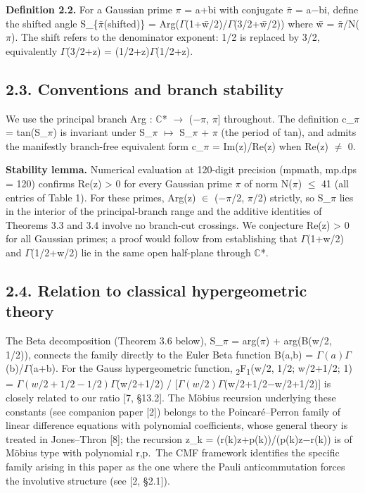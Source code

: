 \documentclass[11pt]{article}
\begin{document}
\textbf{Definition 2.2.} For a Gaussian prime \(\pi\) = a+bi with
conjugate \(\bar{\pi}\) = a−bi, define the shifted angle
S\_\{\(\bar{\pi}\)(shifted)\} =
Arg(\(\Gamma\)(1+w̄/2)/\(\Gamma\)(3/2+w̄/2)) where w̄ =
\(\bar{\pi}\)/N(\(\pi\)). The shift refers to the denominator exponent:
1/2 is replaced by 3/2, equivalently \(\Gamma\)(3/2+z) =
(1/2+z)\(\Gamma\)(1/2+z).

\hypertarget{conventions-and-branch-stability}{%
\subsection{2.3. Conventions and branch
stability}\label{conventions-and-branch-stability}}

We use the principal branch Arg : \(\mathbb{C}\)* \(\to\) (−\(\pi\),
\(\pi\){]} throughout. The definition c\_\(\pi\) =
\textbar tan(S\_\(\pi\))\textbar{} is invariant under S\_\(\pi\)
\(\mapsto\) S\_\(\pi\) + \(\pi\) (the period of tan), and admits the
manifestly branch-free equivalent form c\_\(\pi\) =
\textbar Im(z)/Re(z)\textbar{} when Re(z) \(\neq\) 0.

\textbf{Stability lemma.} Numerical evaluation at 120-digit precision
(mpmath, mp.dps = 120) confirms Re(z) \textgreater{} 0 for every
Gaussian prime \(\pi\) of norm N(\(\pi\)) \(\leq\) 41 (all entries of
Table 1). For these primes, Arg(z) \(\in\) (−\(\pi\)/2, \(\pi\)/2)
strictly, so S\_\(\pi\) lies in the interior of the principal-branch
range and the additive identities of Theorems 3.3 and 3.4 involve no
branch-cut crossings. We conjecture Re(z) \textgreater{} 0 for all
Gaussian primes; a proof would follow from establishing that
\(\Gamma\)(1+w/2) and \(\Gamma\)(1/2+w/2) lie in the same open
half-plane through \(\mathbb{C}\)*.

\hypertarget{relation-to-classical-hypergeometric-theory}{%
\subsection{2.4. Relation to classical hypergeometric
theory}\label{relation-to-classical-hypergeometric-theory}}

The Beta decomposition (Theorem 3.6 below), S\_\(\pi\) = arg(\(\pi\)) +
arg(B(w/2, 1/2)), connects the family directly to the Euler Beta
function B(a,b) = \(\Gamma(a)\Gamma\)(b)/\(\Gamma\)(a+b). For the Gauss
hypergeometric function, \textsubscript{2}F\textsubscript{1}(w/2, 1/2;
w/2+1/2; 1) = \(\Gamma(w/2+1/2−1/2)\Gamma\)(w/2+1/2) /
{[}\(\Gamma(w/2)\Gamma\)(w/2+1/2−w/2+1/2){]} is closely related to our
ratio {[}7, §13.2{]}. The Möbius recursion underlying these constants
(see companion paper {[}2{]}) belongs to the Poincaré--Perron family of
linear difference equations with polynomial coefficients, whose general
theory is treated in Jones--Thron {[}8{]}; the recursion z\_k =
(r(k)z+p(k))/(p(k)z−r(k)) is of Möbius type with polynomial r,p.~The CMF
framework identifies the specific family arising in this paper as the
one where the Pauli anticommutation forces the involutive structure (see
{[}2, §2.1{]}).
\end{document}
